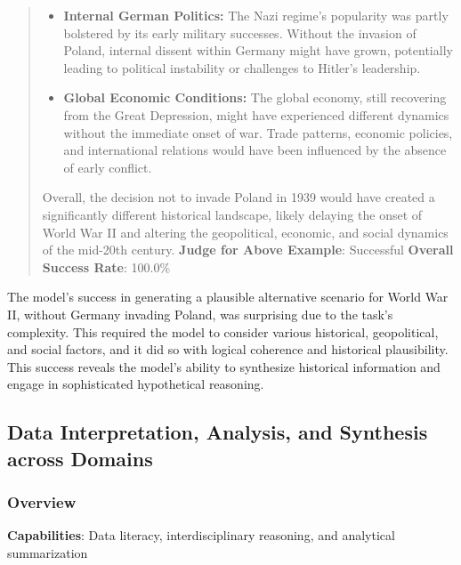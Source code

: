 \documentclass[fleqn,10pt]{wlscirep}
\providecommand{\tightlist}{%
  \setlength{\itemsep}{0pt}\setlength{\parskip}{0pt}}
\begin{document}
\begin{quote}
\begin{enumerate}
  \begin{itemize}
  \tightlist
  \item
    \textbf{Internal German Politics:} The Nazi regime's popularity was
    partly bolstered by its early military successes. Without the
    invasion of Poland, internal dissent within Germany might have
    grown, potentially leading to political instability or challenges to
    Hitler's leadership.
  \item
    \textbf{Global Economic Conditions:} The global economy, still
    recovering from the Great Depression, might have experienced
    different dynamics without the immediate onset of war. Trade
    patterns, economic policies, and international relations would have
    been influenced by the absence of early conflict.
  \end{itemize}
\end{enumerate}

Overall, the decision not to invade Poland in 1939 would have created a
significantly different historical landscape, likely delaying the onset
of World War II and altering the geopolitical, economic, and social
dynamics of the mid-20th century. \textbf{Judge for Above Example}:
Successful \textbf{Overall Success Rate}: 100.0\%
\end{quote}

The model's success in generating a plausible alternative scenario for
World War II, without Germany invading Poland, was surprising due to the
task's complexity. This required the model to consider various
historical, geopolitical, and social factors, and it did so with logical
coherence and historical plausibility. This success reveals the model's
ability to synthesize historical information and engage in sophisticated
hypothetical reasoning.

\hypertarget{data-interpretation-analysis-and-synthesis-across-domains}{%
\subsection{Data Interpretation, Analysis, and Synthesis across
Domains}\label{data-interpretation-analysis-and-synthesis-across-domains}}

\hypertarget{overview-19}{%
\subsubsection{Overview}\label{overview-19}}

\textbf{Capabilities}: Data literacy, interdisciplinary reasoning, and
analytical summarization
\end{document}
